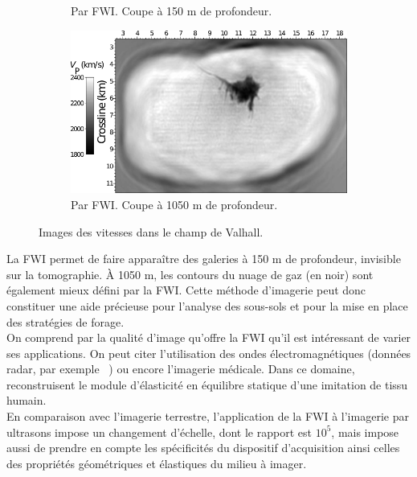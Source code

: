\begin{figure}[!h]
\begin{subfigure}[b]{0.4\textwidth}
        \caption{Par FWI. Coupe à 150 m de profondeur.}
        \label{}
    \end{subfigure}
    \hspace{0.5cm}
    \begin{subfigure}[b]{0.4\textwidth}
        \includegraphics[width=\textwidth]{img/geophy4.png}
        \caption{Par FWI. Coupe à 1050 m de profondeur.}
        \label{}
    \end{subfigure}
    \caption{Images des vitesses dans le champ de Valhall.\label{valhall}}
\end{figure} 
   
La FWI permet de faire apparaître des galeries à 150 m de profondeur, invisible sur la tomographie. À 1050 m, les contours du nuage de gaz (en noir) sont également mieux défini par la FWI. Cette méthode d'imagerie peut donc constituer une aide précieuse pour l'analyse des sous-sols et pour la mise en place des stratégies de forage.\\

On comprend par la qualité d'image qu'offre la FWI qu'il est intéressant de varier ses applications. On peut citer l'utilisation des ondes électromagnétiques (données radar, par exemple ~\cite{lopes}) ou encore l'imagerie médicale. Dans ce domaine, \cite{oberai_03,oberai_04} reconstruisent le module d'élasticité en équilibre statique d'une imitation de tissu humain.\\

En comparaison avec l'imagerie terrestre, l'application de la FWI à l'imagerie par ultrasons impose un changement d'échelle, dont le rapport est $10^5$, mais impose aussi de prendre en compte les spécificités du dispositif d'acquisition ainsi celles des propriétés géométriques et élastiques du milieu à imager.







